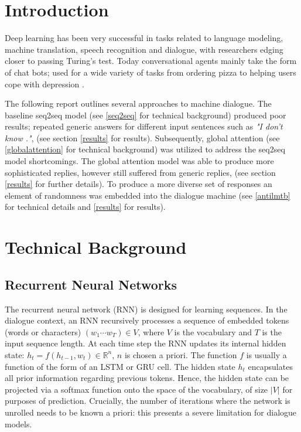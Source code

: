 \documentclass[%
 reprint,
 amsmath,amssymb,
 aps,
]{revtex4-1}
\begin{document}
\maketitle


\section{\label{sec:level1}Introduction}
Deep learning has been very successful in tasks related to language modeling, machine translation, speech recognition and dialogue, with researchers edging closer to passing Turing's test. Today conversational agents mainly take the form of chat bots; used for a wide variety of tasks from ordering pizza to helping users cope with depression \cite{chatbothealth}.

The following report outlines several approaches to machine dialogue. The baseline seq2seq model (see \ref{seq2seq} for technical background) produced poor results; repeated generic answers for different input sentences such as \textit{"I don't know ."}, (see section \ref{results} for results). Subsequently, global attention (see \ref{globalattention} for technical background) was utilized to address the seq2seq model shortcomings. The global attention model was able to produce more sophisticated replies, however still suffered from generic replies, (see section \ref{results} for further details). To produce a more diverse set of responses an element of randomness was embedded into the dialogue machine (see \ref{antilmtb} for technical details and \ref{results} for results).

\section{\label{sec:level1}Technical Background}

\subsection{\label{sec:level2}Recurrent Neural Networks}

The recurrent neural network (RNN) is designed for learning sequences. In the dialogue context, an RNN recursively processes a sequence of embedded tokens (words or characters) $(w_1 \cdots w_T) \in V$, where $V$ is the vocabulary and $T$ is the input sequence length. At each time step the RNN updates its internal hidden state: $h_t = f(h_{t-1}, w_t) \in \mathbb{R}^{n}$, $n$ is chosen a priori. The function $f$ is usually a function of the form of an LSTM or GRU cell. The hidden state $h_t$ encapsulates all prior information regarding previous tokens. Hence, the hidden state can be projected via a softmax function onto the space of the vocabulary, of size $|V|$ for purposes of prediction. Crucially, the number of iterations where the network is unrolled needs to be known a priori: this presents a severe limitation for dialogue models.
\end{document}
